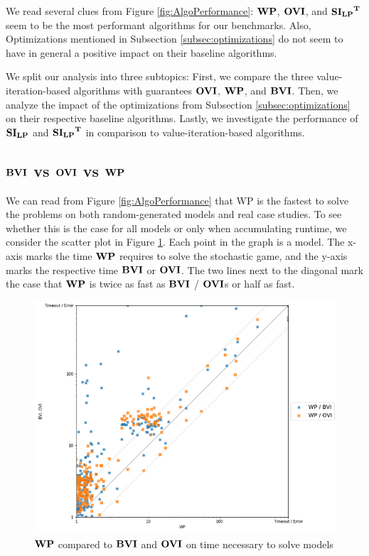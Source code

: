 
We read several clues from Figure \ref{fig:AlgoPerformance}: 
$\WP$, $\OVI$, and $\mathbf{\mathbf{SI_{LP}}^T}$ seem to be the most performant algorithms for our benchmarks. 
Also, Optimizations mentioned in Subsection \ref{subsec:optimizations} do not seem to have in general a positive impact on their baseline algorithms.

We split our analysis into three subtopics: 
First, we compare the three value-iteration-based algorithms with guarantees $\OVI$, $\WP$, and $\BVI$. 
Then, we analyze the impact of the optimizations from Subsection \ref{subsec:optimizations} on their respective baseline algorithms.
Lastly, we investigate the performance of $\mathbf{SI_{LP}}$ and $\mathbf{\mathbf{SI_{LP}}^T}$ in comparison to value-iteration-based algorithms.


\subsection{$\BVI$ vs $\OVI$ vs $\WP$}
We can read from Figure \ref{fig:AlgoPerformance} that WP is the fastest to solve the problems on both random-generated models and real case studies.
To see whether this is the case for all models or only when accumulating runtime, we consider the scatter plot in Figure \ref{fig:WPvsBVIandOVIonRandomRandom}.
Each point in the graph is a model. The x-axis marks the time $\WP$ requires to solve the stochastic game, and the y-axis marks the respective time $\BVI$ or $\OVI$.
The two lines next to the diagonal mark the case that $\WP$ is twice as fast as $\BVI$ / $\OVI$s or half as fast.

\begin{figure}[t]
    \centering
    \includegraphics[width=1\textwidth]{figures/WPvsBVIandOVIonAll.png}
    \caption[$\WP$ compared to $\BVI$ and $\OVI$ on time necessary to solve models]{
        $\WP$ compared to $\BVI$ and $\OVI$ on time necessary to solve models
    }
    \label{fig:WPvsBVIandOVIonRandomRandom}
\end{figure}

